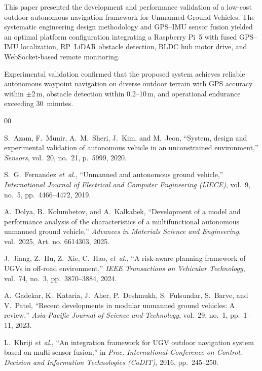 \documentclass[runningheads]{llncs}
\begin{document}
This paper presented the development and performance validation of a low-cost outdoor autonomous navigation framework for Unmanned Ground Vehicles. The systematic engineering design methodology and GPS--IMU sensor fusion yielded an optimal platform configuration integrating a Raspberry Pi~5 with fused GPS--IMU localization, RP~LiDAR obstacle detection, BLDC hub motor drive, and WebSocket-based remote monitoring.

Experimental validation confirmed that the proposed system achieves reliable autonomous waypoint navigation on diverse outdoor terrain with GPS accuracy within $\pm$2\,m, obstacle detection within 0.2--10\,m, and operational endurance exceeding 30~minutes.

\begin{thebibliography}{00}

S.~Azam, F.~Munir, A.~M.~Sheri, J.~Kim, and M.~Jeon, ``System, design and experimental validation of autonomous vehicle in an unconstrained environment,'' \textit{Sensors}, vol.~20, no.~21, p.~5999, 2020.

S.~G.~Fernandez \textit{et~al.}, ``Unmanned and autonomous ground vehicle,'' \textit{International Journal of Electrical and Computer Engineering (IJECE)}, vol.~9, no.~5, pp.~4466--4472, 2019.

A.~Dolya, B.~Kolumbetov, and A.~Kalkabek, ``Development of a model and performance analysis of the characteristics of a multifunctional autonomous unmanned ground vehicle,'' \textit{Advances in Materials Science and Engineering}, vol.~2025, Art. no. 6614303, 2025.

J.~Jiang, Z.~Hu, Z.~Xie, C.~Hao, \textit{et~al.}, ``A risk-aware planning framework of UGVs in off-road environment,'' \textit{IEEE Transactions on Vehicular Technology}, vol.~74, no.~3, pp.~3870--3884, 2024.

A.~Gadekar, K.~Kataria, J.~Aher, P.~Deshmukh, S.~Fulsundar, S.~Barve, and V.~Patel, ``Recent developments in modular unmanned ground vehicles: A review,'' \textit{Asia-Pacific Journal of Science and Technology}, vol.~29, no.~1, pp.~1--11, 2023.

L.~Khriji \textit{et~al.}, ``An integration framework for UGV outdoor navigation system based on multi-sensor fusion,'' in \textit{Proc. International Conference on Control, Decision and Information Technologies (CoDIT)}, 2016, pp.~245--250.


\end{thebibliography}
\end{document}
